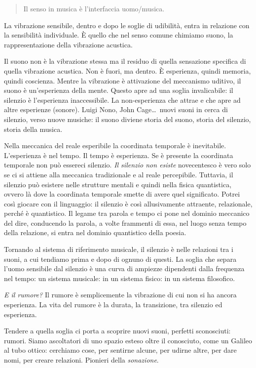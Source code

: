 \begin{quote}
  Il senso in musica è l'interfaccia uomo/musica. \cite{stefani}
\end{quote}

La vibrazione sensibile, dentro e dopo le soglie di udibilità, entra in
relazione con la sensibilità individuale. È quello che nel senso comune
chimiamo suono, la rappresentazione della vibrazione acustica.

Il suono non è la vibrazione stessa ma il residuo di quella sensazione specifica
di quella vibrazione acustica. Non è fuori, ma dentro. È esperienza, quindi
memoria, quindi coscienza. Mentre la vibrazione è attivazione del meccanismo
uditivo, il suono è un'esperienza della mente. Questo apre ad una soglia
invalicabile: il silenzio è l'esperienza inaccessibile. La non-esperienza che
attrae e che apre ad altre esperienze (sonore). Luigi Nono, John
Cage\ldots~nuovi suoni in cerca di silenzio, verso nuove musiche: il suono
diviene storia del suono, storia del silenzio, storia della musica.

Nella meccanica del reale esperibile la coordinata temporale è inevitabile.
L'esperienza è nel tempo. Il tempo è esperienza. Se è presente la coordinata
temporale non può essereci silenzio. \emph{Il silenzio non esiste} novecentesco
è vero solo se ci si attiene alla meccanica tradizionale e al reale percepibile.
Tuttavia, il silenzio può esistere nelle strutture mentali e quindi nella fisica
quantistica, ovvero là dove la coordinata temporale smette di avere quel
significato. Potrei così giocare con il linguaggio: il silenzio è così
allusivamente attraente, relazionale, perché è quantistico. Il legame tra parola
e tempo ci pone nel dominio meccanico del dire, conducendo la parola, a volte
frammenti di essa, nel luogo senza tempo della relazione, si entra nel dominio
quantistico della poesia.

Tornando al sistema di riferimento musicale, il silenzio è nelle relazioni tra i
suoni, a cui tendiamo prima e dopo di ognuno di questi. La soglia che separa
l'uomo sensibile dal silenzio è una curva di ampiezze dipendenti dalla frequenza
nel tempo: un sistema musicale: in un sistema fisico: in un sistema filosofico.

\emph{E il rumore?} Il rumore è semplicemente la vibrazione di cui non si ha
ancora esperienza. La vita del rumore è la durata, la transizione, tra silenzio
ed esperienza.

Tendere a quella soglia ci porta a scoprire nuovi suoni, perfetti sconosciuti:
rumori. Siamo ascoltatori di uno spazio esteso oltre il conosciuto, come un
Galileo al tubo ottico: cerchiamo cose, per sentirne alcune, per udirne
altre, per dare nomi, per creare relazioni. Pionieri della \emph{sonazione}.

